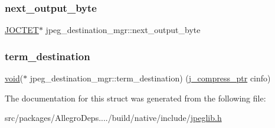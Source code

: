 \subsubsection{\texorpdfstring{next\+\_\+output\+\_\+byte}{next\_output\_byte}}
{\footnotesize\ttfamily \hyperlink{jmorecfg_8h_a356ad249f20e691b520da439f92cccbc}{J\+O\+C\+T\+ET}$\ast$ jpeg\+\_\+destination\+\_\+mgr\+::next\+\_\+output\+\_\+byte}

\mbox{\label{structjpeg__destination__mgr_a25c1b010db7e6fe8bb7139ecfd07b800}} 
\subsubsection{\texorpdfstring{term\+\_\+destination}{term\_destination}}
{\footnotesize\ttfamily \hyperlink{png_8h_ac9c84fa68bbad002983e35ce3663c686}{void}($\ast$ jpeg\+\_\+destination\+\_\+mgr\+::term\+\_\+destination) (\hyperlink{jpeglib_8h_add2a072c54e3a51550f4975f7ddb91e7}{j\+\_\+compress\+\_\+ptr} cinfo)}



The documentation for this struct was generated from the following file\+:\begin{DoxyCompactItemize}
\item 
src/packages/\+Allegro\+Deps..../build/native/include/\hyperlink{jpeglib_8h}{jpeglib.\+h}\end{DoxyCompactItemize}
